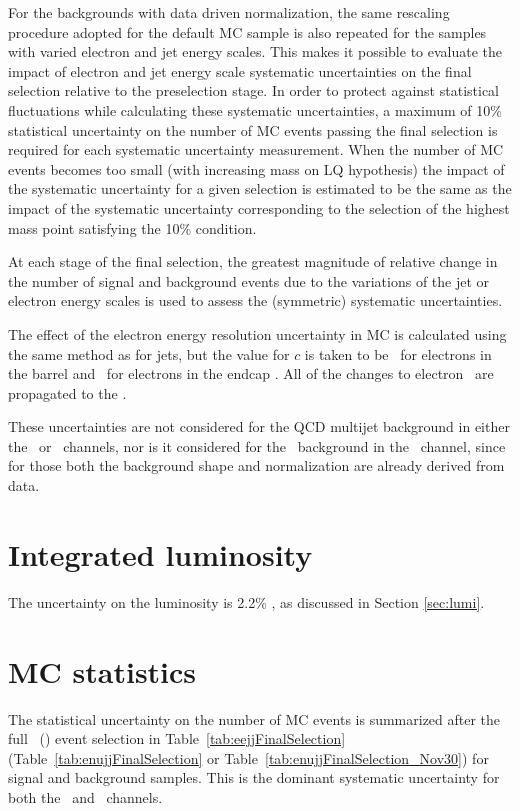 For the backgrounds with data driven normalization, the same 
rescaling procedure adopted for the default MC sample is also repeated 
for the samples with varied electron and jet energy scales. 
This makes it possible to 
evaluate the impact of electron and jet energy scale systematic uncertainties
on the final selection relative to the preselection stage.
In order to protect against statistical fluctuations
while calculating these systematic uncertainties, 
a maximum of 10\% statistical uncertainty on the number of MC events passing the final selection
is required for each systematic uncertainty measurement.
When the number of MC events becomes too small (with increasing mass on LQ hypothesis) 
the impact of the systematic uncertainty for a given selection is estimated to be the same as the 
impact of the systematic uncertainty corresponding to the selection of the 
highest mass point satisfying the 10\% condition.

At each stage of the final selection, 
the greatest magnitude of relative change in the number of signal and 
background events due to the variations 
of the jet or electron energy scales is used to 
assess the (symmetric) systematic uncertainties. 

The effect of the electron energy resolution uncertainty in MC is calculated
using the same method as for jets, but the value for $c$ is taken to be \EEREB~for electrons
in the barrel and \EEREE~for electrons in the endcap \cite{EES}.  
All of the changes to electron \pt~are propagated to the \MET.


These uncertainties are not considered for the QCD multijet background in 
either the \eejj~or \enujj~channels, nor is it considered for the \ttbar~background in the \eejj~channel, 
since for those both the background shape and normalization are already 
derived from data.


\section{Integrated luminosity}

The uncertainty on the luminosity is 2.2\% \cite{cms-lumi-uncertainty}, as discussed in Section \ref{sec:lumi}.

\section{MC statistics}
The statistical uncertainty on the number of MC events is summarized
after the full \eejj~(\enujj) event selection in Table~\ref{tab:eejjFinalSelection} 
(Table~\ref{tab:enujjFinalSelection} or Table~\ref{tab:enujjFinalSelection_Nov30}) for signal and background samples.
This is the dominant systematic uncertainty for both the \enujj~and \eejj~channels.

